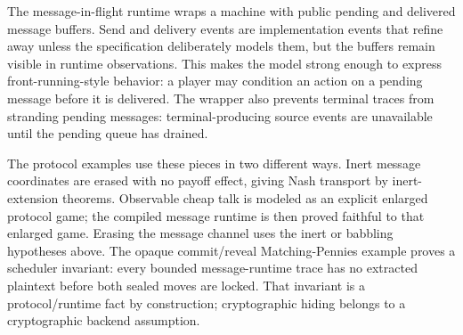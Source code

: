 The message-in-flight runtime wraps a machine with public pending and
delivered message buffers.  Send and delivery events are implementation
events that refine away unless the specification deliberately models
them, but the buffers remain visible in runtime observations.  This makes
the model strong enough to express front-running-style behavior: a player
may condition an action on a pending message before it is delivered.  The
wrapper also prevents terminal traces from stranding pending messages:
terminal-producing source events are unavailable until the pending queue
has drained.

The protocol examples use these pieces in two different ways.  Inert
message coordinates are erased with no payoff effect, giving Nash
transport by inert-extension theorems.  Observable cheap talk is modeled
as an explicit enlarged protocol game; the compiled message runtime is
then proved faithful to that enlarged game.  Erasing the message channel
uses the inert or babbling hypotheses above.  The opaque commit/reveal
Matching-Pennies example
proves a scheduler invariant: every bounded message-runtime trace has no
extracted plaintext before both sealed moves are locked.  That invariant
is a protocol/runtime fact by construction; cryptographic hiding belongs
to a cryptographic backend assumption.

